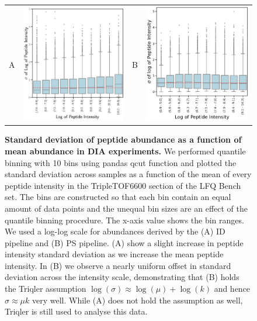 \documentclass[11pt]{article}
\begin{document}
\begin{figure}[hbt]
    \centering
    \centering
    \begin{tabular}{lclc} 
        A & \includegraphics[width=0.4\linewidth]{../../result/report_plots_pipeline/quantile_bins_ID_median.png} &
        B & \includegraphics[width=0.4\linewidth]{../../result/report_plots_pipeline/quantile_bins_PS_median.png} \\
    \end{tabular}
  \caption{{\bf Standard deviation of peptide abundance as a function of mean abundance in DIA experiments.} We performed quantile binning with 10 bins using pandas qcut function and plotted the standard deviation across samples as a function of the mean of every peptide intensity in the TripleTOF6600 section of the LFQ Bench set. The bins are constructed so that each bin contain an equal amount of data points and the unequal bin sizes are an effect of the quantile binning procedure. The x-axis value shows the bin ranges. We used a log-log scale for abundances derived by the (A) ID pipeline and (B) PS pipeline. (A) show a slight increase in peptide intensity standard deviation as we increase the mean peptide intensity. In (B) we observe a nearly uniform offset in standard deviation across the intensity scale, demonstrating that (B) holds the Triqler assumption $\log(\sigma) \approx \log(\mu) + \log(k)$ and hence   $\sigma \approx \mu k$ very well. While (A) does not hold the assumption as well, Triqler is still used to analyse this data.  \label{fig:uniform_offset_in_standard_deviation_boxplot}}

 \end{figure}
 
\end{document}
